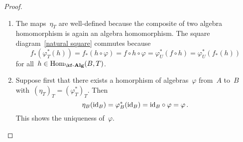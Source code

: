 \begin{proof}
  \leavevmode
  \begin{enumerate}
    \item
      The maps~$\eta_T$ are well-defined because the composite of two algebra homomorphism is again an algebra homomorphism.
      The square diagram~\eqref{natural square} commutes because
      \[
        f_*( \varphi^*_T( h ) )
        =
        f_* (h \circ \varphi)
        =
        f \circ h \circ \varphi
        =
        \varphi^*_U(f \circ h)
        =
        \varphi^*_U(f_*(h))
      \]
      for all~$h \in \Hom_{\cAlg{\kf}}(B,T)$.
    \item
      Suppose first that there exists a homorphism of algebras~$\varphi$ from~$A$ to~$B$ with~$(\eta_T)_T = (\varphi^*_T)_T$.
      Then
      \[
        \eta_B(\mathrm{id}_B) = \varphi^*_B(\mathrm{id}_B) = \mathrm{id}_B \circ \varphi = \varphi \,.
      \]
      This shows the uniqueness of~$\varphi$.


\end{enumerate}
\end{proof}
